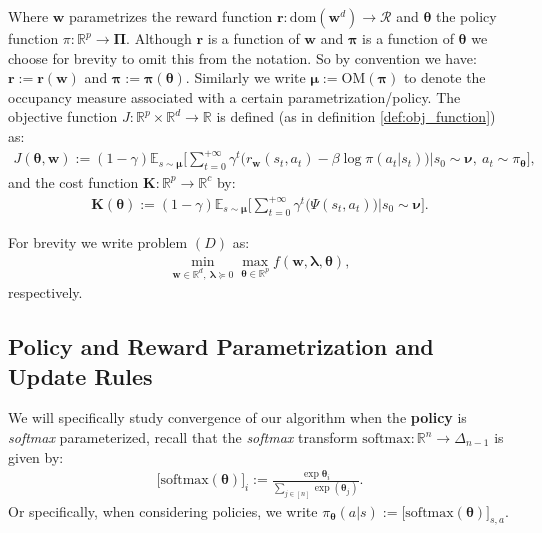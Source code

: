 Where $\bm{w}$ parametrizes the reward function $\bm{r}:\text{dom}(\bm{w}^d)\rightarrow \mathcal{R}$ and $\bm{\theta}$ the policy function $\pi:\mathbb{R}^p \rightarrow \bm{\Pi}$. Although $\bm{r}$ is a function of $\bm{w}$ and $\bm{\pi}$ is a function of $\bm{\theta}$ we choose for brevity to omit this from the notation. So by convention we have: $\bm{r} := \bm{r}(\bm{w})$ and $\bm{\pi}:= \bm{\pi}(\bm{\theta})$. Similarly we write $\bm{\mu}:=\text{OM}(\bm{\pi})$ to denote the occupancy measure associated with a certain parametrization/policy. The objective function $J:\mathbb{R}^p \times \mathbb{R}^d \rightarrow \mathbb{R}$ is defined (as in definition \ref{def:obj_function}) as:
\begin{align*}
    J(\bm{\theta},\bm{w}) := (1-\gamma) \mathbb{E}_{s \sim \bm{\mu}} \Big[ \sum_{t=0}^{+\infty}  \gamma^t \bigl( r_{\bm{w}}(s_t,a_t) - \beta \log \pi(a_t|s_t)\bigr) \Big| s_0 \sim \bm{\nu}, ~ a_t \sim \pi_{\bm{\theta}} \Big], 
\end{align*}
and the cost function $\bm{K}:\mathbb{R}^p \rightarrow \mathbb{R}^c$ by:
\begin{align*}
    \bm{K}(\bm{\theta}) := (1-\gamma) \mathbb{E}_{s \sim \bm{\mu}} \Big[ \sum_{t=0}^{+\infty}  \gamma^t \bigl( \Psi(s_t,a_t) \bigr) \Big| s_0 \sim \bm{\nu} \Big].
\end{align*}

For brevity we write problem $(D)$ as:
\begin{align*}
    \min_{\bm{w}\in\mathbb{R}^d, ~ \bm{\lambda}\succcurlyeq 0}\max_{\bm{\theta}\in\mathbb{R}^p} 
    f(\bm{w},\bm{\lambda},\bm{\theta}), \tag{D}
\end{align*}
respectively. 

\subsection{Policy and Reward Parametrization and Update Rules}

We will specifically study convergence of our algorithm when the \textbf{policy} is \textit{softmax} parameterized, recall that the \textit{softmax} transform $\text{softmax}:\mathbb{R}^n\rightarrow \Delta_{n-1}$ is given by:
\begin{align*}
    \big[\text{softmax}(\bm{\theta})\big]_i := \frac{\exp \bm{\theta}_i}{\sum_{j\in[n]} \exp(\bm{\theta}_j)}.
\end{align*}
\noindent
Or specifically, when considering policies, we write $ \pi_{\bm{\theta}} (a|s) := \big[\text{softmax}(\bm{\theta})\big]_{s,a}$.

